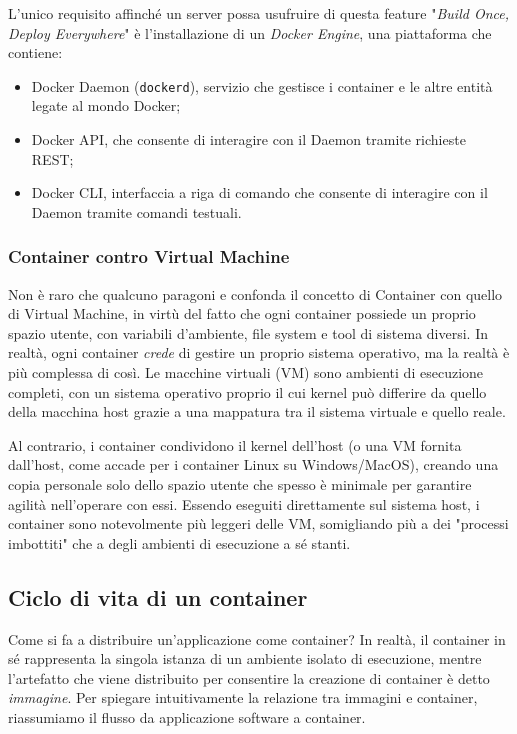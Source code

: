 L'unico requisito affinché un server possa usufruire di questa feature "\emph{Build Once, Deploy Everywhere}" è l'installazione di un \emph{Docker Engine}, una piattaforma che contiene:
\begin{itemize}
    \item Docker Daemon (\texttt{dockerd}), servizio che gestisce i container e le altre entità legate al mondo Docker;
    \item Docker API, che consente di interagire con il Daemon tramite richieste REST;
    \item Docker CLI, interfaccia a riga di comando che consente di interagire con il Daemon tramite comandi testuali.
\end{itemize}

\subsubsection{Container contro Virtual Machine}
Non è raro che qualcuno paragoni e confonda il concetto di Container con quello di Virtual Machine, in virtù del fatto che ogni container possiede un proprio spazio utente, con variabili d'ambiente, file system e tool di sistema diversi. In realtà, ogni container \emph{crede} di gestire un proprio sistema operativo, ma la realtà è più complessa di così.
Le macchine virtuali (VM) sono ambienti di esecuzione completi, con un sistema operativo proprio il cui kernel può differire da quello della macchina host grazie a una mappatura tra il sistema virtuale e quello reale.

Al contrario, i container condividono il kernel dell'host (o una VM fornita dall'host, come accade per i container Linux su Windows/MacOS), creando una copia personale solo dello spazio utente che spesso è minimale per garantire agilità nell'operare con essi. Essendo eseguiti direttamente sul sistema host, i container sono notevolmente più leggeri delle VM, somigliando più a dei "processi imbottiti" che a degli ambienti di esecuzione a sé stanti.

\subsection{Ciclo di vita di un container}
Come si fa a distribuire un'applicazione come container?
In realtà, il container in sé rappresenta la singola istanza di un ambiente isolato di esecuzione, mentre l'artefatto che viene distribuito per consentire la creazione di container è detto \emph{immagine}. Per spiegare intuitivamente la relazione tra immagini e container, riassumiamo il flusso da applicazione software a container.

